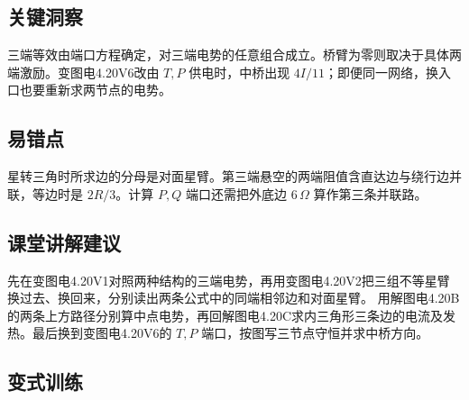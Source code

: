 \documentclass[UTF8,fontset=fandol,a4paper,11pt]{ctexart}
\begin{document}


\subsection*{关键洞察}

三端等效由端口方程确定，对三端电势的任意组合成立。桥臂为零则取决于具体两端激励。变图电4.20V6改由 $T,P$ 供电时，中桥出现 $4I/11$；即便同一网络，换入口也要重新求两节点的电势。



\subsection*{易错点}

星转三角时所求边的分母是对面星臂。第三端悬空的两端阻值含直达边与绕行边并联，等边时是 $2R/3$。计算 $P,Q$ 端口还需把外底边 $6\,\Omega$ 算作第三条并联路。



\subsection*{课堂讲解建议}

先在变图电4.20V1对照两种结构的三端电势，再用变图电4.20V2把三组不等星臂换过去、换回来，分别读出两条公式中的同端相邻边和对面星臂。
用解图电4.20B的两条上方路径分别算中点电势，再回解图电4.20C求内三角形三条边的电流及发热。最后换到变图电4.20V6的 $T,P$ 端口，按图写三节点守恒并求中桥方向。


\subsection*{变式训练}
\end{document}
